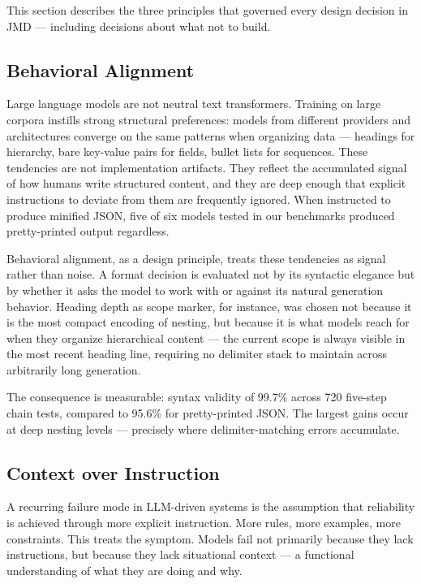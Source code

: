 \documentclass[11pt]{article}
\begin{document}
This section describes the three principles that governed every design decision in JMD --- including decisions about what not to build.

\subsection{Behavioral Alignment}

Large language models are not neutral text transformers. Training on large corpora instills strong structural preferences: models from different providers and architectures converge on the same patterns when organizing data --- headings for hierarchy, bare key-value pairs for fields, bullet lists for sequences. These tendencies are not implementation artifacts. They reflect the accumulated signal of how humans write structured content, and they are deep enough that explicit instructions to deviate from them are frequently ignored. When instructed to produce minified JSON, five of six models tested in our benchmarks produced pretty-printed output regardless.

Behavioral alignment, as a design principle, treats these tendencies as signal rather than noise. A format decision is evaluated not by its syntactic elegance but by whether it asks the model to work with or against its natural generation behavior. Heading depth as scope marker, for instance, was chosen not because it is the most compact encoding of nesting, but because it is what models reach for when they organize hierarchical content --- the current scope is always visible in the most recent heading line, requiring no delimiter stack to maintain across arbitrarily long generation.

The consequence is measurable: syntax validity of 99.7\% across 720 five-step chain tests, compared to 95.6\% for pretty-printed JSON. The largest gains occur at deep nesting levels --- precisely where delimiter-matching errors accumulate.

\subsection{Context over Instruction}

A recurring failure mode in LLM-driven systems is the assumption that reliability is achieved through more explicit instruction. More rules, more examples, more constraints. This treats the symptom. Models fail not primarily because they lack instructions, but because they lack situational context --- a functional understanding of what they are doing and why.
\end{document}

